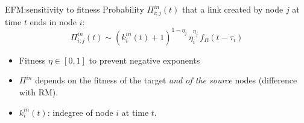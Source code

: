 \begin{frame}{EFM:\@ sensitivity to fitness}
    Probability $\Pi_{i;j}^{in}(t)$ that a link created by node $j$ at time $t$ ends in node $i$:
    \[
        \Pi_{i;j}^{in}(t) \sim (k_i^{in}(t)+1)^{1-\eta_j} \, \eta_i^{\eta_j} \, f_R(t-\tau_i)
    \]
    \begin{itemize}
        \item Fitness $\eta \in [0, 1]$ to prevent negative exponents
        \item $\Pi^{in}$ depends on the fitness of the target \emph{and of the source} nodes (difference with RM).
        \item $k_i^{in}(t)$: indegree of node $i$ at time $t$.
    \end{itemize}
\end{frame}

